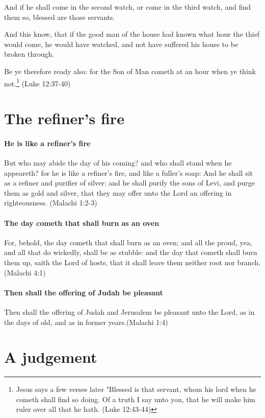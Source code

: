 And if he shall come in the second watch, or come in the third watch, and find them so, blessed are those servants.

And this know, that if the good man of the house had known what hour the thief would come, he would have watched, and not have suffered his house to be broken through. 

Be ye therefore ready also: for the Son of Man cometh at an hour when ye think not.\footnote{Jesus says a few verses later "Blessed is that servant, whom his lord when he cometh shall find so doing. Of a truth I say unto you, that he will make him ruler over all that he hath. (Luke 12:43-44)} (Luke 12:37-40)


\section{The refiner's fire}

\paragraph{He is like a refiner's fire}
But who may abide the day of his coming? and who shall stand when he appeareth? for he is like a refiner's fire, and like a fuller's soap: And he shall sit as a refiner and purifier of silver: and he shall purify the sons of Levi, and purge them as gold and silver, that they may offer unto the Lord an offering in righteousness. (Malachi 1:2-3)

\paragraph{The day cometh that shall burn as an oven}
For, behold, the day cometh that shall burn as an oven; and all the proud, yea, and all that do wickedly, shall be as stubble: and the day that cometh shall burn them up, saith the Lord of hosts, that it shall leave them neither root nor branch. (Malachi 4:1)

\paragraph{Then shall the offering of Judah be pleasant}
Then shall the offering of Judah and Jerusalem be pleasant unto the Lord, as in the days of old, and as in former years.(Malachi 1:4)

\section{A judgement}

